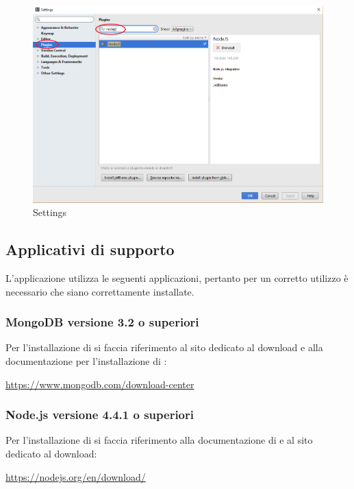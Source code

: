 \documentclass[12pt,a4paper]{article}
\begin{document}
	\begin{center}
		\begin{figure}[H]
			\centering
			\includegraphics[max width=\myheight, scale=0.7]{../img/manualeSviluppatore/plugin.png}
			\caption{Settings}
		\end{figure}
	\end{center}
	
	\subsection{Applicativi di supporto} \label{app_supporto}
		
		L'applicazione \prj{} utilizza le seguenti applicazioni, pertanto per un corretto utilizzo è necessario che siano correttamente installate.
		\subsubsection{MongoDB versione 3.2 o superiori}
		Per l'installazione di  si faccia riferimento al sito dedicato al download e alla documentazione per l'installazione di :
		\begin{center} \url{https://www.mongodb.com/download-center}
		\end{center}
		
		\subsubsection{Node.js versione 4.4.1 o superiori}
		Per l'installazione di  si faccia riferimento alla documentazione di  e al sito dedicato al download:
		\begin{center} \url{https://nodejs.org/en/download/} 
		\end{center}
\end{document}
